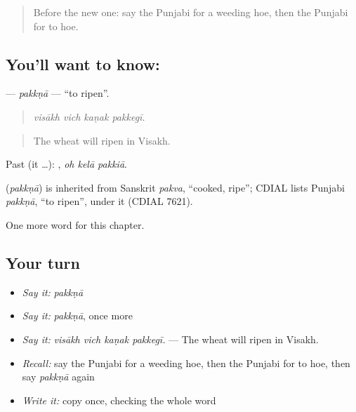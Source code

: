 \begin{quote}
Before the new one: say the Punjabi for a weeding hoe, then the Punjabi for to hoe.
\end{quote}

\subsection*{You'll want to know: }
\textbf{} — \emph{pakkṇā} — \textquotedblleft{}to ripen\textquotedblright{}.

\begin{quote}
   
\end{quote}

\begin{quote}
\emph{visākh vich kaṇak pakkegī.}
\end{quote}

\begin{quote}
The wheat will ripen in Visakh.
\end{quote}

Past (it …):   , \emph{oh kelā pakkiā}.

\begin{cousinweb}
\textbf{} (\emph{pakkṇā}) is inherited from Sanskrit \emph{pakva}, \textquotedblleft{}cooked, ripe\textquotedblright{}; CDIAL lists Punjabi \emph{pakkṇā}, \textquotedblleft{}to ripen\textquotedblright{}, under it (CDIAL 7621).
\end{cousinweb}

\begin{grammarlens}[title={What you've built}]
One more word for this chapter.
\end{grammarlens}

\subsection*{Your turn}
\begin{itemize}
\raggedright
  \item \emph{Say it:} \emph{pakkṇā}
  \item \emph{Say it:} \emph{pakkṇā}, once more
  \item \emph{Say it:} \emph{visākh vich kaṇak pakkegī.} — The wheat will ripen in Visakh.
  \item \emph{Recall:} say the Punjabi for a weeding hoe, then the Punjabi for to hoe, then say \emph{pakkṇā} again
  \item \emph{Write it:} copy \textbf{} once, checking the whole word
\end{itemize}

